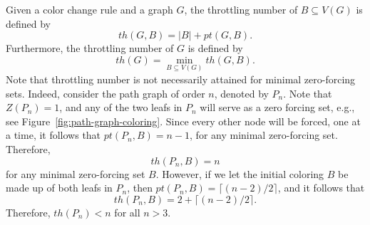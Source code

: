 \documentclass{article}
\theoremstyle{definition}
\newcommand\abs[1]{\left|#1\right|}
\begin{document}
Given a color change rule and a graph $G$, the throttling number of $B\subseteq V(G)$ is defined by
\[
th(G,B) = \abs{B} + pt(G,B).
\]
Furthermore, the throttling number of $G$ is defined by
\[
th(G) = \min_{B\subseteq V(G)} th(G,B).
\]
Note that throttling number is not necessarily attained for minimal zero-forcing sets. 
Indeed, consider the path graph of order $n$, denoted by $P_{n}$. 
Note that $Z\left(P_{n}\right)=1$, and any of the two leafs in $P_{n}$ will serve as a zero forcing set, e.g., see Figure~\ref{fig:path-graph-coloring}. 
Since every other node will be forced, one at a time, it follows that $pt\left(P_{n},B\right)=n-1$, for any minimal zero-forcing set. 
Therefore,
\[
th\left(P_{n},B\right) = n
\]
for any minimal zero-forcing set $B$. 
However, if we let the initial coloring $B$ be made up of both leafs in $P_{n}$, then $pt\left(P_{n},B\right)=\lceil (n-2)/2 \rceil$, and it follows that
\[
th\left(P_{n},B\right) = 2 + \lceil (n-2)/2 \rceil.
\]
Therefore, $th\left(P_{n}\right) < n$ for all $n>3$. 
\label{Bibliography}


\end{document}
